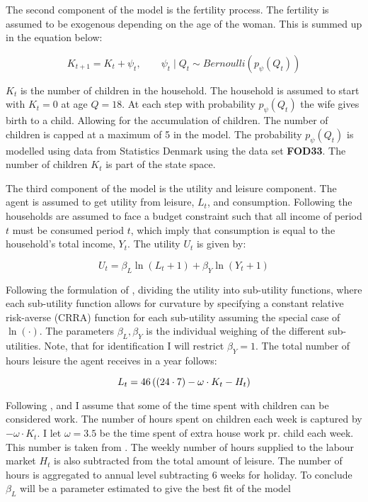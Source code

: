 The second component of the model is the fertility process. The fertility is assumed to be exogenous depending on the age of the woman. This is summed up in the equation below:

\begin{equation}
    K_{t+1} = K_t+ \psi_t, \qquad \psi_t \mid Q_t \sim Bernoulli (p_\psi(Q_t))
\end{equation}

$K_t$ is the number of children in the household. The household is assumed to start with $K_t = 0$ at age $Q=18$. At each step with probability $p_\psi(Q_t)$ the wife gives birth to a child. Allowing for the accumulation of children. The number of children is capped at a maximum of 5 in the model. The probability $p_\psi(Q_t)$ is modelled using data from Statistics Denmark using the data set \textbf{FOD33}. The number of children $K_t$ is part of the state space. 

The third component of the model is the utility and leisure component. The agent is assumed to get utility from leisure, $L_t$, and consumption. Following \textcite{francesconi_joint_2002} the households are assumed to face a budget constraint such that all income of period $t$ must be consumed period $t$, which imply that consumption is equal to the household's total income, $Y_t$. The utility $U_t$ is given by:

\begin{equation}
    U_t = \beta_L \ln(L_t + 1) + \beta_Y \ln(Y_t + 1)
\end{equation}

Following the formulation of \textcite{adda_career_2011}, dividing the utility into sub-utility functions, where each sub-utility function allows for curvature by specifying a constant relative risk-averse (CRRA) function for each sub-utility assuming the special case of $\ln(\cdot)$. The parameters $\beta_L, \beta_Y$ is the individual weighing of the different sub-utilities. Note, that for identification I will restrict $\beta_Y= 1$. The total number of hours leisure the agent receives in a year follows: 

\begin{equation}
    L_t = 46 \left( \left( 24 \cdot 7 \right) - \omega \cdot K_t - H_t \right)
\end{equation}

Following \textcite{firestone_estimation_1988}, \textcite{thrane_men_2000} and \textcite{ekert-jaffe_time_2015} I assume that some of the time spent with children can be considered work. The number of hours spent on children each week is captured by $-\omega \cdot K_t$. I let $\omega=3.5$ be the time spent of extra house work pr. child each week. This number is taken from \textcite{ekert-jaffe_time_2015}. The weekly number of hours supplied to the labour market $H_t$ is also subtracted from the total amount of leisure. The number of hours is aggregated to annual level subtracting 6 weeks for holiday. To conclude $\beta_L$ will be a parameter estimated to give the best fit of the model

